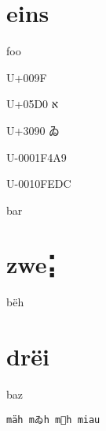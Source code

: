 \documentclass{article}%
\begin{document}
\section{eins}

foo

U+009F 

U+05D0 א

U+3090 ゐ

U-0001F4A9 💩

U-0010FEDC 􏻜

bar

\section{zwe⡅}

bëh

\section{drëi}

baz

\begin{lstlisting}
mäh mゐh m💩h miau
\end{lstlisting}
\end{document}
